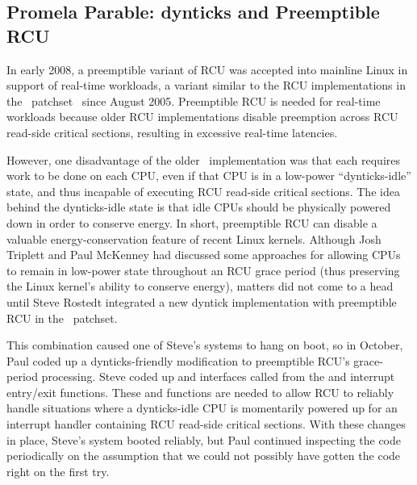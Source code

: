 

\subsection{Promela Parable:
			     {dynticks} and Preemptible RCU}
\label{sec:formal:Promela Parable: dynticks and Preemptible RCU}

In early 2008, a preemptible variant of RCU was accepted into
mainline Linux in support of real-time workloads,
a variant similar to the RCU implementations in
the \rt\ patchset~\cite{IngoMolnar05a}
since August 2005.
Preemptible RCU is needed for real-time workloads because older
RCU implementations disable preemption across RCU read-side
critical sections, resulting in excessive real-time latencies.

However, one disadvantage of the older \rt\ implementation
was that each 
requires work to be done on each CPU, even if that CPU is in a low-power
``dynticks-idle'' state,
and thus incapable of executing RCU read-side critical sections.
The idea behind the dynticks-idle state is that idle CPUs
should be physically powered down in order to conserve energy.
In short, preemptible RCU can disable a valuable energy-conservation
feature of recent Linux kernels.
Although Josh Triplett and Paul McKenney
had discussed some approaches for allowing
CPUs to remain in low-power state throughout an RCU grace period
(thus preserving the Linux kernel's ability to conserve energy), matters
did not come to a head until Steve Rostedt integrated a new dyntick
implementation with preemptible RCU in the \rt\ patchset.

This combination caused one of Steve's systems to hang on boot, so in
October, Paul coded up a dynticks-friendly modification to preemptible RCU's
grace-period processing.
Steve coded up  and 
interfaces called from the
 and  interrupt
entry/exit functions.
These  and 
functions are needed to allow RCU to reliably handle situations where
a dynticks-idle CPU is momentarily powered up for an interrupt
handler containing RCU read-side critical sections.
With these changes in place, Steve's system booted reliably,
but Paul continued inspecting the code periodically on the assumption
that we could not possibly have gotten the code right on the first try.

